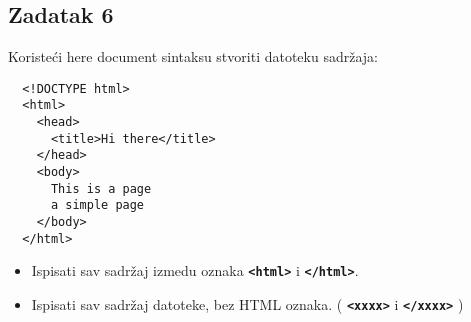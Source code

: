 \documentclass[12pt,a4paper]{article}
\newcommand{\shell}[1]{\texttt{\textbf{#1}}}
\begin{document}
\subsection*{Zadatak 6}
  Koristeći here document sintaksu stvoriti datoteku sadržaja:
  \begin{verbatim}
  <!DOCTYPE html>
  <html>
    <head>
      <title>Hi there</title>
    </head>
    <body>
      This is a page
      a simple page
    </body>
  </html>
  \end{verbatim}
  \begin{itemize}
    \item Ispisati sav sadržaj izmedu oznaka \shell{<html>} i \shell{</html>}.
    \item Ispisati sav sadržaj datoteke, bez HTML oznaka. ( \shell{<xxxx>} i \shell{</xxxx>} )
  \end{itemize}
\end{document}
